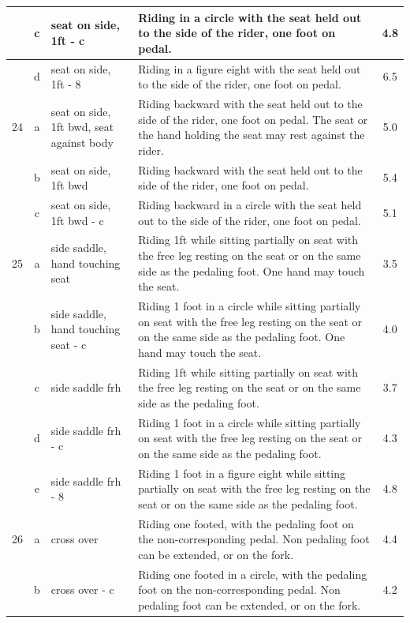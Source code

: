 \begin{longtable}{|r|c|p{4cm}|p{8cm}|c|}
\hline
  & c & seat on side, 1ft - c & Riding in a circle with the seat held out to the side of the rider, one foot on pedal.  & 4.8 \\ 
\hline
  & d & seat on side, 1ft - 8 & Riding in a figure eight with the seat held out to the side of the rider, one foot on pedal.  & 6.5 \\ 
\hline
24  & a & seat on side, 1ft bwd, seat against body  & Riding backward with the seat held out to the side of the rider, one foot on pedal. The seat or the hand holding the seat may rest against the rider. & 5.0 \\ 
\hline
  & b & seat on side, 1ft bwd & Riding backward with the seat held out to the side of the rider, one foot on pedal. & 5.4 \\ 
\hline
  & c & seat on side, 1ft bwd - c & Riding backward in a circle with the seat held out to the side of the rider, one foot on pedal. & 5.1 \\ 
\hline
25  & a & side saddle, hand touching seat & Riding 1ft while sitting partially on seat with the free leg resting on the seat or on the same side as the pedaling foot. One hand may touch the seat. & 3.5 \\ 
\hline
  & b & side saddle, hand touching seat - c & Riding 1 foot in a circle while sitting partially on seat with the free leg resting on the seat or on the same side as the pedaling foot. One hand may touch the seat.  & 4.0 \\ 
\hline
  & c & side saddle frh & Riding 1ft while sitting partially on seat with the free leg resting on the seat or on the same side as the pedaling foot.  & 3.7 \\ 
\hline
  & d & side saddle frh - c & Riding 1 foot in a circle while sitting partially on seat with the free leg resting on the seat or on the same side as the pedaling foot. & 4.3 \\ 
\hline
  & e & side saddle frh - 8 & Riding 1 foot in a figure eight while sitting partially on seat with the free leg resting on the seat or on the same side as the pedaling foot. & 4.8 \\ 
\hline
26  & a & cross over  & Riding one footed, with the pedaling foot on the non-corresponding pedal. Non pedaling foot can be extended, or on the fork.  & 4.4 \\ 
\hline
  & b & cross over - c  & Riding one footed in a circle, with the pedaling foot on the non-corresponding pedal. Non pedaling foot can be extended, or on the fork.  & 4.2 \\ 
\hline

\end{longtable}
